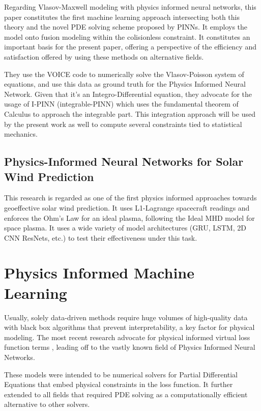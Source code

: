 \documentclass[12pt]{article}
\begin{document}
Regarding Vlasov-Maxwell modeling with physics informed neural networks, this paper constitutes the first machine learning approach intersecting both this theory and the novel PDE solving scheme proposed by PINNs. \cite{kumar2023physicsinformedneuralnetworks} It employs the model onto fusion modeling within the colisionless constraint. It constitutes an important basis for the present paper, offering a perspective of the efficiency and satisfaction offered by using these methods on alternative fields.

They use the VOICE code to numerically solve the Vlasov-Poisson system of equations, and use this data as ground truth for the Physics Informed Neural Network. Given that it's an Integro-Differential equation, they advocate for the usage of I-PINN (integrable-PINN) \cite{} which uses the fundamental theorem of Calculus to approach the integrable part. This integration approach will be used by the present work as well to compute several constraints tied to statistical mechanics.

\subsection{Physics-Informed Neural Networks for Solar Wind Prediction}

This research \cite{johnson2022physics} is regarded as one of the first physics informed approaches towards geoeffective solar wind prediction. It uses L1-Lagrange spacecraft readings and enforces the Ohm's Law for an ideal plasma, following the Ideal MHD model for space plasma. It uses a wide variety of model architectures (GRU, LSTM, 2D CNN ResNets, etc.) to test their effectiveness under this task.

\section{Physics Informed Machine Learning}
Usually, solely data-driven methods require huge volumes of high-quality data with black box algorithms that prevent interpretability, a key factor for physical modeling. The most recent research advocate for physical informed virtual loss function terms \cite{}, leading off to the vastly known field of Physics Informed Neural Networks.

These models were intended to be numerical solvers for Partial Differential Equations that embed physical constraints in the loss function. It further extended to all fields that required PDE solving as a computationally efficient alternative to other solvers.
\end{document}

